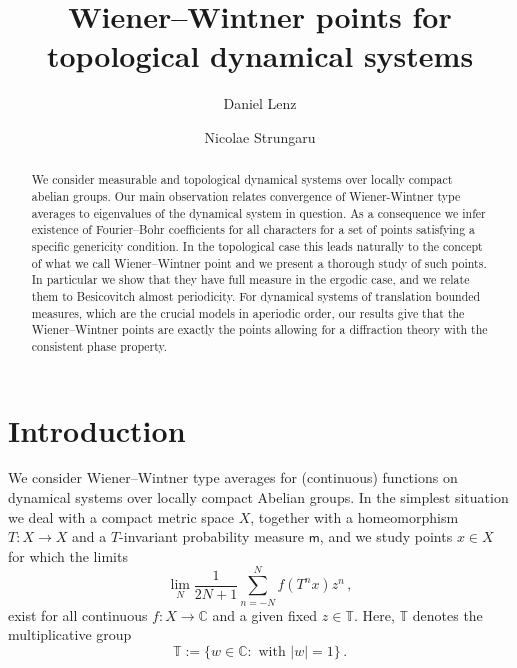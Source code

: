 \documentclass [14pt]{amsart}
\numberwithin{equation}{section}
\newcommand{\CC}{{\mathbb C}}
\newcommand{\TT}{\mathbb T}
\newcommand{\mm}{\mathsf{m}}
\begin{document}
\title{Wiener--Wintner points for topological dynamical systems }
\author{Daniel Lenz}
\address{Mathematisches Institut, Friedrich Schiller Universit\"at Jena, 07743 Jena, Germany}

\author{Nicolae Strungaru}
\address{Department of Mathematics and Statistics, MacEwan University \\
10700 -- 104 Avenue, Edmonton, AB, T5J 4S2, Canada\\
and \\
Institute of Mathematics ``Simon Stoilow''\\
Bucharest, Romania}

\begin{abstract}
We consider measurable and topological dynamical systems over locally compact abelian groups. Our main observation  relates convergence  of Wiener-Wintner type averages to
eigenvalues of the dynamical system in question. As a consequence we infer
 existence of Fourier--Bohr coefficients for all characters for a set of points satisfying a specific genericity condition. In the topological case this leads naturally to the concept of what we call Wiener--Wintner point and we present a thorough study of such points. In particular we show that they have full measure in the ergodic case, and we relate them to Besicovitch almost periodicity. For dynamical systems of translation bounded measures, which are the  crucial models in aperiodic order, our results give that the Wiener--Wintner points are exactly the points allowing for a diffraction theory with the consistent phase property.
\end{abstract}

\maketitle



\section{Introduction}
We consider Wiener--Wintner type  averages for (continuous) functions on
dynamical systems over locally compact Abelian groups.  In the
simplest situation we deal with a compact metric space $X$, together with a
homeomorphism  $T  : X\longrightarrow X$ and a $T$-invariant
probability measure $\mm$, and we study points $x\in X$ for which the
limits
\begin{equation}\label{eq2}
\lim_N \frac{1}{2N+1} \sum_{n=-N}^N f(T^n x) z^n \,,
\end{equation}
exist for all continuous $f : X\longrightarrow \CC$ and a given  fixed
$z\in \TT$. Here, $\TT$ denotes the multiplicative group
$$\TT:=\{w\in\CC: \mbox{ with }  |w| =1\} \,.$$
\end{document}
